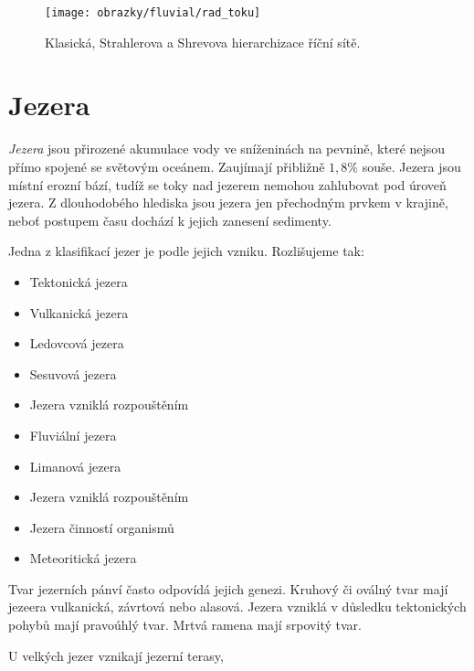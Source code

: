 \begin{figure}
	\centering
	\texttt{[image: obrazky/fluvial/rad\_toku]}
	\caption{Klasická, Strahlerova a Shrevova hierarchizace říční sítě.}
	\label{fig:radtoku}
\end{figure}


\section{Jezera}
\emph{Jezera} jsou přirozené akumulace vody ve sníženinách na pevnině, které nejsou přímo spojené se světovým oceánem. Zaujímají přibližně $1,8 \%$ souše. Jezera jsou místní erozní bází, tudíž se toky nad jezerem nemohou zahlubovat pod úroveň jezera. Z dlouhodobého hlediska jsou jezera jen přechodným prvkem v krajině, neboť postupem času dochází k jejich zanesení sedimenty. 

Jedna z klasifikací jezer je podle jejich vzniku. Rozlišujeme tak:
\begin{itemize}
	\item Tektonická jezera	
	\item Vulkanická jezera
	\item Ledovcová jezera
	\item Sesuvová jezera
	\item Jezera vzniklá rozpouštěním
	\item Fluviální jezera
	\item Limanová jezera
	\item Jezera vzniklá rozpouštěním
	\item Jezera činností organismů
	\item Meteoritická jezera
\end{itemize}

Tvar jezerních pánví často odpovídá jejich genezi. Kruhový či oválný tvar mají jezeera vulkanická, závrtová nebo alasová. Jezera vzniklá v důsledku tektonických pohybů mají pravoúhlý tvar. Mrtvá ramena mají srpovitý tvar.


U velkých jezer vznikají jezerní terasy,




%
%		
%
%	
%
